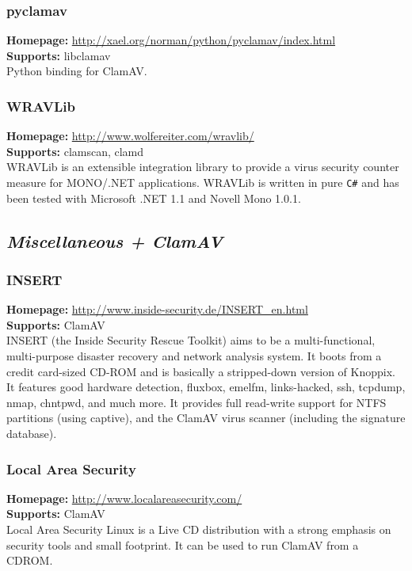 \documentclass[a4paper,titlepage,12pt]{article}
\begin{document}
    \subsubsection{pyclamav}
    \textbf{Homepage:} \url{http://xael.org/norman/python/pyclamav/index.html}\\
    \textbf{Supports:} libclamav\\[4pt]
    Python binding for ClamAV.

    \subsubsection{WRAVLib}
    \textbf{Homepage:} \url{http://www.wolfereiter.com/wravlib/}\\
    \textbf{Supports:} clamscan, clamd\\[4pt]
    WRAVLib is an extensible integration library to provide a virus security
    counter measure for MONO/.NET applications. WRAVLib is written in pure
    \verb+C#+ and has been tested with Microsoft .NET 1.1 and Novell Mono 1.0.1.

    \subsection{\emph{Miscellaneous + ClamAV}}

    \subsubsection{INSERT}
    \textbf{Homepage:} \url{http://www.inside-security.de/INSERT_en.html}\\
    \textbf{Supports:} ClamAV\\[4pt]
    INSERT (the Inside Security Rescue Toolkit) aims to be a multi-functional,
    multi-purpose disaster recovery and network analysis system. It boots from
    a credit card-sized CD-ROM and is basically a stripped-down version of
    Knoppix. It features good hardware detection, fluxbox, emelfm,
    links-hacked, ssh, tcpdump, nmap, chntpwd, and much more. It provides full
    read-write support for NTFS partitions (using captive), and the ClamAV
    virus scanner (including the signature database). 

    \subsubsection{Local Area Security}
    \textbf{Homepage:} \url{http://www.localareasecurity.com/}\\
    \textbf{Supports:} ClamAV\\[4pt]
    Local Area Security Linux is a Live CD distribution with a strong
    emphasis on security tools and small footprint. It can be used to run
    ClamAV from a CDROM. 
\end{document}
